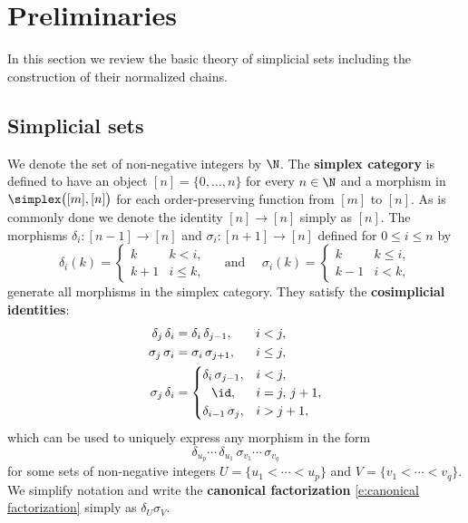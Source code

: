 
\section{Preliminaries}\label{s:preliminaries}

In this section we review the basic theory of simplicial sets including the construction of their normalized chains.

\subsection{Simplicial sets}

We denote the set of non-negative integers by $\N$.
The \textbf{simplex category} is defined to have an object $[n] = \{0, \dots, n\}$ for every $n \in \N$ and a morphism in $\simplex \big([m], [n] \big)$ for each order-preserving function from $[m]$ to $[n]$.
As is commonly done we denote the identity $[n] \to [n]$ simply as $[n]$.
The morphisms $\delta_i \colon [n-1] \to [n]$ and $\sigma_i \colon [n+1] \to [n]$ defined for $0 \leq i \leq n$ by
\[
\delta_i(k) =
\begin{cases} k & k < i, \\ k+1 & i \leq k, \end{cases}
\quad \text{ and } \quad
\sigma_i(k) =
\begin{cases} k & k \leq i, \\ k-1 & i < k, \end{cases}
\]
generate all morphisms in the simplex category.
They satisfy the \textbf{cosimplicial identities}:
\begin{equation}\label{e:cosimplicial identities}
\begin{split}
\delta_j \, \delta_i &=
\delta_i \, \delta_{j-1}, \hspace*{18.3pt} i < j, \\
\sigma_j \, \sigma_i &=
\sigma_i \, \sigma_{j+1}, \hspace*{15.9pt} i \leq j, \\
\sigma_j \, \delta_i &=
\begin{cases}
\delta_i \, \sigma_{j-1}, & i < j, \\
\hfil \id, & i = j,\, j+1, \\
\delta_{i-1} \, \sigma_{j}, & i > j + 1,
\end{cases}
\end{split}
\end{equation}
which can be used to uniquely express any morphism in the form
\begin{equation}\label{e:canonical factorization}
\delta_{u_{p}} \cdots\, \delta_{u_1}\, \sigma_{v_1} \cdots\, \sigma_{v_q}
\end{equation}
for some sets of non-negative integers $U = \{u_1 < \cdots < u_{p}\}$ and $V = \{v_1 < \cdots < v_{q}\}$.
We simplify notation and write the \textbf{canonical factorization} \eqref{e:canonical factorization} simply as $\delta_U \sigma_V$.

